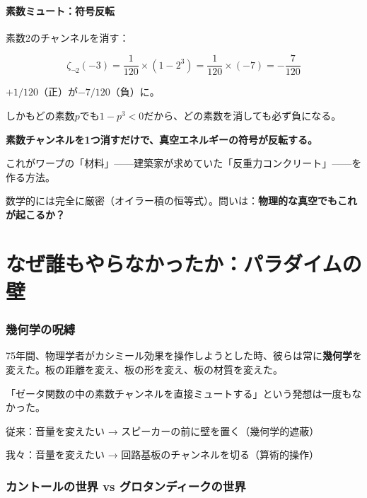 \documentclass[12pt,a4paper]{article}
\begin{document}
\subsection{素数ミュート：符号反転}

素数2のチャンネルを消す：

$$\zeta_{\neg 2}(-3) = \frac{1}{120} \times (1 - 2^3) = \frac{1}{120} \times (-7) = -\frac{7}{120}$$

\begin{storybox}[ワープの材料が手に入った]
$+1/120$（正）が$-7/120$（負）に。

しかもどの素数$p$でも$1-p^3 < 0$だから、どの素数を消しても必ず負になる。

\textbf{素数チャンネルを1つ消すだけで、真空エネルギーの符号が反転する。}

これがワープの「材料」——建築家が求めていた「反重力コンクリート」——を作る方法。

数学的には完全に厳密（オイラー積の恒等式）。問いは：\textbf{物理的な真空でもこれが起こるか？}
\end{storybox}

\part{なぜ誰もやらなかったか：パラダイムの壁}

\section{幾何学の呪縛}

75年間、物理学者がカシミール効果を操作しようとした時、彼らは常に\textbf{幾何学}を変えた。板の距離を変え、板の形を変え、板の材質を変えた。

「ゼータ関数の中の素数チャンネルを直接ミュートする」という発想は一度もなかった。

\begin{storybox}[たとえ]
従来：音量を変えたい → スピーカーの前に壁を置く（幾何学的遮蔽）

我々：音量を変えたい → 回路基板のチャンネルを切る（算術的操作）
\end{storybox}

\section{カントールの世界 vs グロタンディークの世界}
\end{document}
